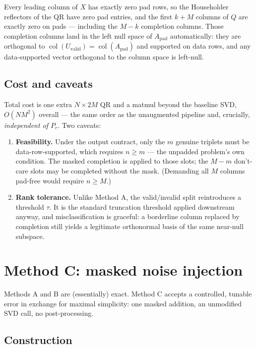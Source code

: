 \documentclass[11pt]{article}
\newcommand{\Apad}{A_{\mathrm{pad}}}
\begin{document}
Every leading column of $X$ has exactly zero pad rows, so the Householder
reflectors of the QR have zero pad entries, and the first $k + M$ columns of
$Q$ are exactly zero on pads --- including the $M - k$ completion columns.
Those completion columns land in the left null space of $\Apad$ automatically:
they are orthogonal to
$\operatorname{col}(U_{\mathrm{valid}}) = \operatorname{col}(\Apad)$
and supported on data rows, and any data-supported vector orthogonal to the
column space is left-null.

\subsection*{Cost and caveats}

Total cost is one extra $N \times 2M$ QR and a matmul beyond the baseline SVD,
$O(NM^2)$ overall --- the same order as the unaugmented pipeline and, crucially,
\emph{independent of $P_r$}. Two caveats:
\begin{enumerate}[itemsep=1pt]
  \item \textbf{Feasibility.} Under the output contract, only the $m$ genuine
        triplets must be data-row-supported, which requires $n \ge m$ --- the
        unpadded problem's own condition. The masked completion is applied to
        those slots; the $M - m$ don't-care slots may be completed without the
        mask. (Demanding all $M$ columns pad-free would require $n \ge M$.)
  \item \textbf{Rank tolerance.} Unlike Method A, the valid/invalid split
        reintroduces a threshold $\tau$. It is the standard truncation
        threshold applied downstream anyway, and misclassification is graceful:
        a borderline column replaced by completion still yields a legitimate
        orthonormal basis of the same near-null subspace.
\end{enumerate}

\section{Method C: masked noise injection}\label{sec:noise}

Methods A and B are (essentially) exact. Method C accepts a controlled,
tunable error in exchange for maximal simplicity: one masked addition, an
unmodified SVD call, no post-processing.

\subsection*{Construction}
\end{document}
